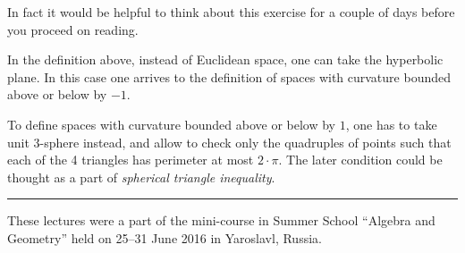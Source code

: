 In fact it would be helpful to think about this exercise for a couple of days before you proceed on reading.

In the definition above, 
instead of Euclidean space, 
one can take the hyperbolic plane.
In this case
one arrives to the definition of spaces with curvature bounded above or below by $-1$.

To define spaces with curvature bounded above or below by $1$,
one has to take unit 3-sphere instead,
and allow to check only the quadruples of points such that each of the 4 triangles has perimeter at most $2\cdot\pi$.
The later condition could be thought as a part of \emph{spherical triangle inequality}.

\medskip
\noindent\rule{2cm}{0.4pt}

These lectures were a part of the mini-course in Summer School ``Algebra and Geometry'' held on 25--31 June 2016 in Yaroslavl, Russia.







